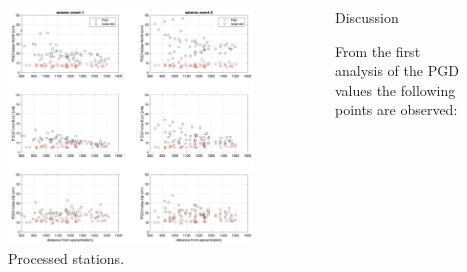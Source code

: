 \documentclass[final,a0,portrait]{beamer}
\newlength{\sepwid}
\newlength{\onecolwid}
\newlength{\twocolwid}
\begin{document}
\begin{frame}[t]
\begin{columns}[t]
\begin{column}{\twocolwid}
\vskip-3cm
\begin{columns}[t]
\begin{column}{\onecolwid}
	\begin{figure}
	\begin{center}
	\vskip1cm
	  \includegraphics[width=.97\textwidth]{figures/PGD_maxnoise_vs_distance_2.jpg}
	\end{center}
	    \caption{Processed stations.}
	    \label{fig:proc-net}
	\end{figure}      
\end{column}


\begin{column}{\sepwid}\end{column} %

\begin{column}{\onecolwid}
\begin{block}{Discussion}
{\small

From the first analysis of the PGD values the following points are observed:

}
\end{block}
\end{column}
\end{columns}
\end{column}
\end{columns}
\end{frame}
\end{document}
